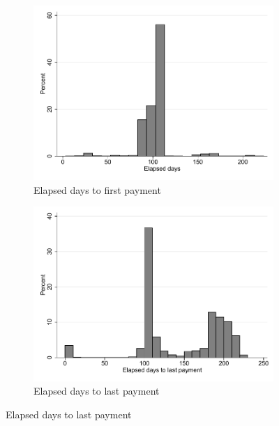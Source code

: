 \documentclass[oneside,11pt]{article}
\begin{document}
\vspace{.2in}
\begin{figure}[H]
    \caption{Behavior of those who lost pawn}
    \label{proxy_naive}
    \begin{center}
    \begin{subfigure}{0.40\textwidth}
        \caption{Elapsed days to first payment}
        \centering
        \includegraphics[width=\textwidth]{Figuras/hist_firstdays_default.pdf}
    \end{subfigure}
    \begin{subfigure}{0.40\textwidth}
        \caption{Elapsed days to last payment}
        \centering
        \includegraphics[width=\textwidth]{Figuras/hist_days_default.pdf}
    \end{subfigure}

\end{center}
\end{figure}
\end{document}
